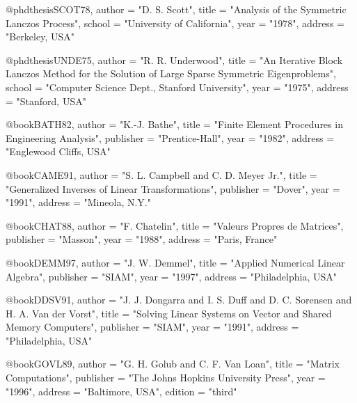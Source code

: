 @phdthesis{SCOT78,
   author       = "D. S. Scott", 
   title        = "{Analysis of the Symmetric Lanczos Process}",
   school       = "University of California",
   year         = "1978",
   address      = "Berkeley, USA"}

@phdthesis{UNDE75,
   author       = "R. R. Underwood",
   title        = "{An Iterative Block Lanczos Method for the Solution
                   of Large Sparse Symmetric Eigenproblems}",
   school       = "Computer Science Dept., Stanford University",
   year         = "1975",
   address      = "Stanford, USA"}


@book{BATH82,
   author       = "K.-J. Bathe",
   title        = "Finite Element Procedures in Engineering Analysis",
   publisher    = "Prentice-Hall",
   year         = "1982",
   address      = "Englewood Cliffs, USA"}

@book{CAME91,
   author       = "S. L. Campbell and C. D. Meyer Jr.",
   title        = "Generalized Inverses of Linear Transformations",
   publisher    = "Dover",
   year         = "1991",
   address      = "Mineola, N.Y."}

@book{CHAT88,
   author       = "F. Chatelin",
   title        = "Valeurs Propres de Matrices",
   publisher    = "Masson",
   year         = "1988",
   address      = "Paris, France"}

@book{DEMM97,
   author       = "J. W. Demmel",
   title        = "Applied Numerical Linear Algebra",
   publisher    = "SIAM",
   year         = "1997",
   address      = "Philadelphia, USA"}

@book{DDSV91,
   author       = "J. J. Dongarra and I. S. Duff and D. C. Sorensen and
                   H. A. Van der Vorst",
   title        = "Solving Linear Systems on Vector and Shared
                   Memory Computers",
   publisher    = "SIAM",
   year         = "1991",
   address      = "Philadelphia, USA"}

@book{GOVL89,
   author       = "G. H. Golub and C. F. Van Loan",
   title        = "Matrix Computations",
   publisher    = "The Johns Hopkins University Press",
   year         = "1996",
   address      = "Baltimore, USA",
   edition      = "third"}

